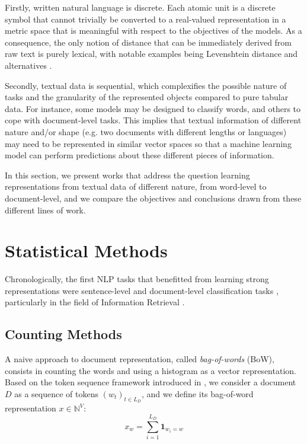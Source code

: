 Firstly, written natural language is discrete. Each atomic unit is a discrete symbol that cannot trivially be converted to a real-valued representation in a metric space that is meaningful with respect to the objectives of the models. As a consequence, the only notion of distance that can be immediately derived from raw text is purely lexical, with notable examples being Levenshtein distance \citep{levenshtein1966binary} and alternatives \citep{hamming, jaro}.

Secondly, textual data is sequential, which complexifies the possible nature of tasks and the granularity of the represented objects compared to pure tabular data. For instance, some models may be designed to classify words, and others to cope with document-level tasks. This implies that textual information of different nature and/or shape (e.g. two documents with different lengths or languages) may need to be represented in similar vector spaces so that a machine learning model can perform predictions about these different pieces of information.


In this section, we present works that address the question learning representations from textual data of different nature, from word-level to document-level, and we compare the objectives and conclusions drawn from these different lines of work.




\section{Statistical Methods}

Chronologically, the first NLP tasks that benefitted from learning  strong representations were sentence-level and document-level classification tasks \citep{baharudin2010review}, particularly in the field of Information Retrieval \citep{chowdhury2010introduction}. 

\subsection{Counting Methods}

A naive approach to document representation, called \textit{bag-of-words} (BoW), consists in counting the words and using a histogram as a vector representation. Based on the token sequence framework introduced in , we consider a document $D$ as a sequence of tokens $(w_t)_{t \in {L_D}}$, and we define its bag-of-word representation $x \in \mathbb{N}^V$:
$$
x_w = \sum_{i=1}^{L_D} \mathbf{1}_{w_i = w}
$$

